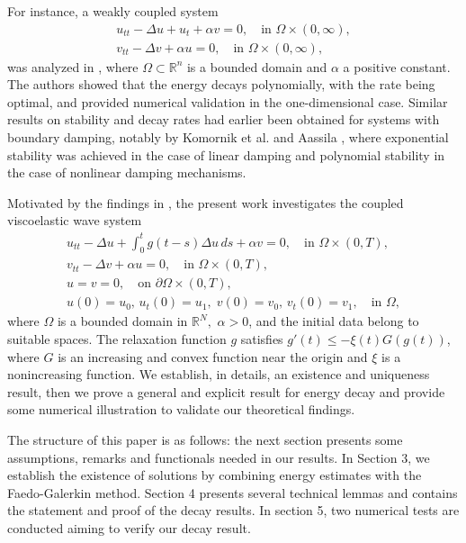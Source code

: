 \documentclass[10pt,a4paper]{amsart}
\numberwithin{equation}{section}
\begin{document}
For instance, a weakly coupled system
\begin{gather*}
u_{tt} - \Delta u + u_t + \alpha v = 0, \quad \text{in } \Omega \times (0, \infty), \\
v_{tt} - \Delta v + \alpha u = 0, \quad \text{in } \Omega \times (0, \infty),
\end{gather*}
was analyzed in \cite{LRF}, where $\Omega \subset \mathbb{R}^n$ is a bounded domain and
$\alpha$ a positive constant. The authors showed that the energy decays polynomially,
with the rate being optimal, and provided numerical validation in the one-dimensional case.
Similar results on stability and decay rates had earlier been obtained for systems with
boundary damping, notably by Komornik et al. \cite{KVBR} and Aassila \cite{Assila1, Assila2},
where exponential stability was achieved in the case of linear damping and polynomial stability
in the case of nonlinear damping mechanisms.

Motivated by the findings in \cite{GASM}, the present work investigates the coupled viscoelastic wave system
\begin{equation} \label{e1.1}
\begin{gathered}
u_{tt} - \Delta u + \int_0^t g(t - s) \Delta u \, ds + \alpha v = 0, \quad
 \text{in } \Omega \times (0, T), \\
v_{tt} - \Delta v + \alpha u = 0, \quad \text{in } \Omega \times (0, T), \\
u = v = 0, \quad \text{on } \partial \Omega \times (0, T), \\
u(0) = u_0, \, u_t(0) = u_1, \; v(0) = v_0, \, v_t(0) = v_1, \quad \text{in } \Omega,
\end{gathered}
\end{equation}
where \( \Omega \) is a bounded domain in \( \mathbb{R}^N, \) \( \alpha > 0 \), and the initial
data belong to suitable spaces. The relaxation function \( g \) satisfies
\( g'(t) \leq -\xi(t) G(g(t)) \), where $G$ is an increasing and convex function near the origin and
$\xi$ is a nonincreasing function. We establish, in details, an existence and uniqueness result,
then we prove a general and explicit result for energy decay and provide some numerical
illustration to validate our theoretical findings.

The structure of this paper is as follows: the next section presents some assumptions,
remarks and functionals needed in our results. In Section 3, we establish the existence of
solutions by combining energy estimates with the Faedo-Galerkin method.
Section 4 presents several technical lemmas and contains the statement and proof of the
decay results.
In section 5, two numerical tests are conducted aiming to verify our decay result.
\end{document}
